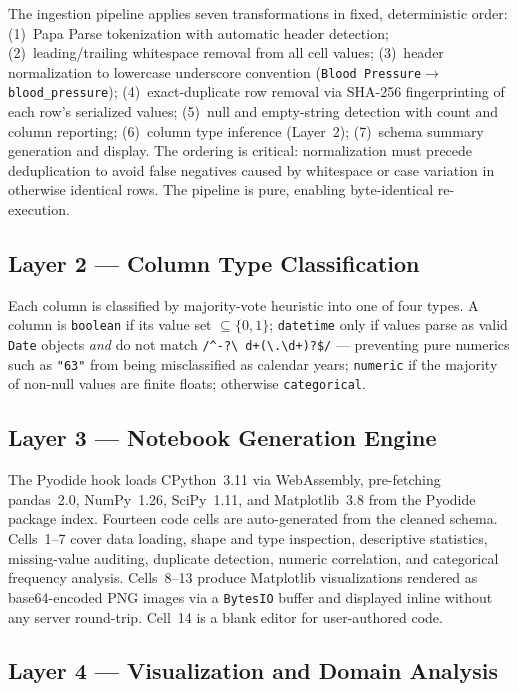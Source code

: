 \documentclass[conference]{IEEEtran}
\begin{document}
The ingestion pipeline applies seven transformations in fixed,
deterministic order: (1)~Papa Parse tokenization with automatic header
detection; (2)~leading/trailing whitespace removal from all cell values;
(3)~header normalization to lowercase underscore convention
(\texttt{Blood Pressure}$\to$\texttt{blood\_pressure});
(4)~exact-duplicate row removal via SHA-256 fingerprinting of each
row's serialized values; (5)~null and empty-string detection with count
and column reporting; (6)~column type inference (Layer~2); (7)~schema
summary generation and display. The ordering is critical: normalization
must precede deduplication to avoid false negatives caused by whitespace
or case variation in otherwise identical rows. The pipeline is pure,
enabling byte-identical re-execution.

\subsection{Layer 2 — Column Type Classification}

Each column is classified by majority-vote heuristic into one of four
types. A column is \texttt{boolean} if its value set $\subseteq\{0,1\}$;
\texttt{datetime} only if values parse as valid \texttt{Date} objects
\emph{and} do not match \texttt{/\textasciicircum-?\textbackslash
d+(\textbackslash.\textbackslash d+)?\$/} — preventing pure numerics
such as \texttt{"63"} from being misclassified as calendar years;
\texttt{numeric} if the majority of non-null values are finite floats;
otherwise \texttt{categorical}.

\subsection{Layer 3 — Notebook Generation Engine}

The Pyodide hook loads CPython~3.11 via WebAssembly, pre-fetching
pandas~2.0, NumPy~1.26, SciPy~1.11, and Matplotlib~3.8 from the
Pyodide package index. Fourteen code cells are auto-generated from the
cleaned schema. Cells~1--7 cover data loading, shape and type inspection,
descriptive statistics, missing-value auditing, duplicate detection,
numeric correlation, and categorical frequency analysis. Cells~8--13
produce Matplotlib visualizations rendered as base64-encoded PNG images
via a \texttt{BytesIO} buffer and displayed inline without any server
round-trip. Cell~14 is a blank editor for user-authored code.

\subsection{Layer 4 — Visualization and Domain Analysis}
\end{document}
